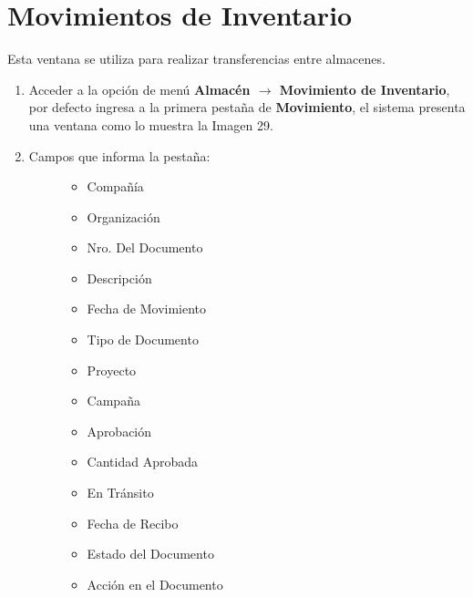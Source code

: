 \documentclass[letterpaper,10pt,spanish]{sphinxmanual}
\begin{document}
\section{Movimientos de Inventario}
\label{stock:movimientos-de-inventario}
Esta ventana se utiliza para realizar transferencias entre almacenes.
\begin{enumerate}
\item {} 
Acceder a la opción de menú \textbf{Almacén \(\rightarrow\) Movimiento de Inventario}, por defecto ingresa a la primera pestaña de \textbf{Movimiento}, el sistema presenta una ventana como lo muestra la Imagen 29.

\item {} \begin{description}
\item[{Campos que informa la pestaña:}] \leavevmode\begin{itemize}
\item {} 
Compañía

\item {} 
Organización

\item {} 
Nro. Del Documento

\item {} 
Descripción

\item {} 
Fecha de Movimiento

\item {} 
Tipo de Documento

\item {} 
Proyecto

\item {} 
Campaña

\item {} 
Aprobación

\item {} 
Cantidad Aprobada

\item {} 
En Tránsito

\item {} 
Fecha de Recibo

\item {} 
Estado del Documento

\item {} 
Acción en el Documento

\end{itemize}

\end{description}


\end{enumerate}
\end{document}
